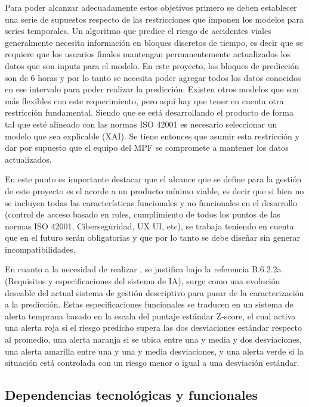 Para poder alcanzar adecuadamente estos objetivos primero se deben establecer una serie de supuestos respecto de las restricciones que imponen los modelos para series temporales. Un algoritmo que predice el riesgo de accidentes viales generalmente necesita información en bloques discretos de tiempo,  es decir que se requiere que los usuarios finales mantengan permanentemente actualizados los datos que son inputs para el modelo. En este proyecto, los bloques de predicción son de 6 horas y por lo tanto se necesita poder agregar todos los datos conocidos en ese intervalo para poder realizar la predicción. Existen otros modelos que son más flexibles con este requerimiento, pero aquí hay que tener en cuenta otra restricción fundamental. Siendo que se está desarrollando el producto de forma tal que esté alineado con las normas ISO 42001 es necesario seleccionar un modelo que sea explicable (XAI). Se tiene entonces que asumir esta restricción y dar por supuesto que el equipo del MPF se compromete a mantener los datos actualizados.

En este punto es importante destacar que el alcance que se define para la gestión de este proyecto es el acorde a un producto mínimo viable, es decir que si bien no se incluyen todas las características funcionales y no funcionales en el desarrollo (control de acceso basado en roles, cumplimiento de todos los puntos de las normas ISO 42001, Ciberseguridad, UX UI, etc), se trabaja teniendo en cuenta que en el futuro serán obligatorias y que por lo tanto se debe diseñar sin generar incompatibilidades.

En cuanto a la necesidad de realizar , se justifica bajo la referencia B.6.2.2a (Requisitos y especificaciones del sistema de IA), surge como una evolución deseable del actual sistema de gestión descriptivo para pasar de la caracterización a la predicción. Estas especificaciones funcionales se traducen en un sistema de alerta temprana basado en la escala del puntaje estándar Z-score, el cual activa una alerta roja si el riesgo predicho supera las dos desviaciones estándar respecto al promedio, una alerta naranja si se ubica entre una y media y dos desviaciones, una alerta amarilla entre una y una y media desviaciones, y una alerta verde si la situación está controlada con un riesgo menor o igual a una desviación estándar.

\subsection{Dependencias tecnológicas y funcionales}\label{dependencias-tecnoluxf3gicas-y-funcionales}

